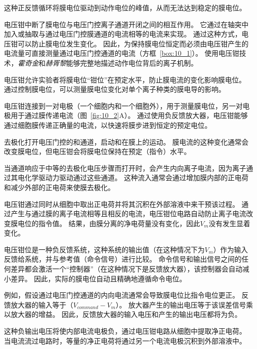 这种正反馈循环将膜电位驱动到动作电位的峰值，从而无法达到稳定的膜电位。


电压钳中断了膜电位与电压门控离子通道开闭之间的相互作用。
它通过在轴突中加入或抽取与通过电压门控膜通道的电流相等的电流来实现。
通过这种方式，电压钳可以防止膜电位发生变化。
因此，为保持膜电位恒定而必须由电压钳产生的电流量可直接测量通过电压门控通道的电流（方框~\ref{box:10_1}）。
使用电压钳技术，\textit{霍奇金}和\textit{赫胥黎}能够完整地描述动作电位背后的离子机制。


\begin{proposition}[电压钳技术] \label{box:10_1}
	
	\quad \quad 电压钳允许实验者将膜电位“钳位”在预定水平，防止膜电流的变化影响膜电位。
	通过控制膜电位，可以测量膜电位变化对单个离子种类的膜电导的影响。
	
	\quad \quad 电压钳连接到一对电极（一个细胞内和一个细胞外），用于测量膜电位，另一对电极用于通过膜传递电流（图~\ref{fig:10_2}A）。
	通过使用负反馈放大器，电压钳能够通过细胞膜传递正确量的电流，以快速将膜步进到恒定的预定电位。
	
	\quad \quad 去极化打开电压门控的和通道，启动和在膜上的运动。
	膜电流的这种变化通常会改变膜电位，但电压钳会将膜电位保持在预定（指令）水平。
	
	\quad \quad 当通道响应于中等的去极化电压步骤而打开时，会产生内向离子电流，因为离子通过其电化学驱动力驱动通过这些通道。
	这种流入通常会通过增加膜内部的正电荷和减少外部的正电荷来使膜去极化。
	
	\quad \quad 电压钳通过同时从细胞中取出正电荷并将其沉积在外部溶液中来干预该过程。
	通过产生与通过膜的离子电流相等且相反的电流，电压钳位电路自动防止离子电流改变膜电位的指令值。
	结果，由膜分离的净电荷量没有变化，因此$V_m$没有发生显着变化。
	
	\quad \quad 电压钳位是一种负反馈系统，这种系统的输出值（在这种情况下为$V_m$）作为输入反馈给系统，并与参考值（命令信号）进行比较。
	命令信号和输出信号之间的任何差异都会激活一个“控制器”（在这种情况下是反馈放大器），该控制器会自动减小差异。
	因此，实际的膜电位自动且精确地遵循命令电位。
	
	\quad \quad 例如，假设通过电压门控通道的内向电流通常会导致膜电位比指令电位更正。
	反馈放大器的输入等于（$V_{command}-V_m$）。
	放大器产生的输出电压等于该误差信号乘以放大器的增益。
	因此，反馈放大器的输入电压和产生的输出电压都将为负。
	
	\quad \quad 这种负输出电压将使内部电流电极负，通过电压钳电路从细胞中提取净正电荷。
	当电流流过电路时，等量的净正电荷将通过另一个电流电极沉积到外部溶液中。
	

\end{proposition}
